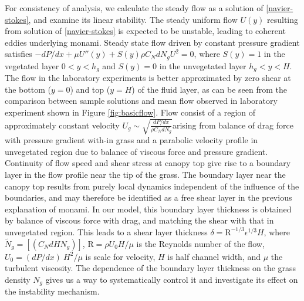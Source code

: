 \documentclass[aps,prl,twocolumn,showpacs,superscriptaddress,groupedaddress,10pt]{revtex4-1}  %
\newcommand{\hg}{h_g}
\newcommand{\Rey}{\text{R}}
\newcommand{\Ndg}{\tilde{N}_g}
\begin{document}
For consistency of analysis, we calculate the steady flow as a solution of \eqref{navier-stokes}, and examine its linear stability. The steady uniform flow $U(y)$ resulting from solution of \eqref{navier-stokes} is expected to be unstable, leading to coherent eddies underlying monami. Steady state flow driven by constant pressure gradient satisfies
$-{dP}/{dx}+\mu U''(y) +S(y) \rho C_N d N_gU^2=0$, where $S(y)=1$ in the vegetated layer $0<y<\hg$ and $S(y)=0$ in the unvegetated layer $\hg< y< H$. 
The flow in the laboratory experiments is better approximated by zero shear at the bottom ($y=0$) and top ($y=H$) of the fluid layer, as can be seen from the comparison 
between sample solutions and mean flow observed in laboratory experiment shown in Figure \ref{fig:basicflow}. Flow consist of a region of approximately constant velocity
\small$U_g \sim \sqrt{\frac{dP/dx}{\rho C_N dN_g}}$\normalsize arising from balance of drag force with pressure gradient with-in grass and a parabolic velocity 
profile in unvegetated region due to balance of viscous force and pressure gradient. Continuity of flow speed and shear stress at canopy top 
give rise to a boundary layer in the flow profile near the tip of the grass. The boundary layer near the canopy top results from purely local dynamics independent of the influence of the boundaries, and may therefore be identified as a free shear layer\cite{Ghisal02} in the previous explanation of monami. 
In our model, this boundary layer thickness is obtained by balance of viscous force with drag, and matching the shear with that in unvegetated region. This leads to a shear layer 
thickness $\delta = \Rey^{-1/3} \epsilon^{1/3} H$, where $\Ndg = \left[(C_N d H N_g)\right]$, $\Rey=\rho U_0 H/\mu$ is the Reynolds number of the flow, $U_0 = {(dP/dx)~H^2}/{\mu}$ is scale for velocity,
$H$ is half channel width, and $\mu$ the turbulent viscosity. The dependence of the boundary layer thickness on the grass density $N_g$ gives us a way to systematically control it and investigate its effect on the instability mechanism. 
\end{document}
